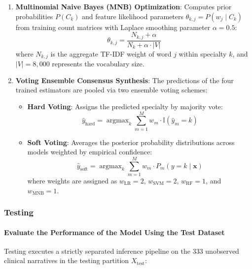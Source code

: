 \begin{enumerate}
    \item \textbf{Multinomial Naive Bayes (MNB) Optimization}:
    Computes prior probabilities $P(C_k)$ and feature likelihood parameters $\theta_{k,j} = P(w_j \mid C_k)$ from training count matrices with Laplace smoothing parameter $\alpha = 0.5$:
    \begin{equation}
        \theta_{k,j} = \frac{N_{k,j} + \alpha}{N_k + \alpha \cdot |V|}
    \end{equation}
    where $N_{k,j}$ is the aggregate TF-IDF weight of word $j$ within specialty $k$, and $|V| = 8,000$ represents the vocabulary size.

    \item \textbf{Voting Ensemble Consensus Synthesis}:
    The predictions of the four trained estimators are pooled via two ensemble voting schemes:
    \begin{itemize}
        \item \textbf{Hard Voting}: Assigns the predicted specialty by majority vote:
        \begin{equation}
            \hat{y}_{\text{hard}} = \operatorname{argmax}_k \sum_{m=1}^{M} w_m \cdot \mathbb{I}(\hat{y}_m = k)
        \end{equation}
        \item \textbf{Soft Voting}: Averages the posterior probability distributions across models weighted by empirical confidence:
        \begin{equation}
            \hat{y}_{\text{soft}} = \operatorname{argmax}_k \sum_{m=1}^{M} w_m \cdot P_m(y = k \mid \mathbf{x})
        \end{equation}
        where weights are assigned as $w_{\text{LR}} = 2$, $w_{\text{SVM}} = 2$, $w_{\text{RF}} = 1$, and $w_{\text{MNB}} = 1$.
    \end{itemize}
\end{enumerate}

\subsubsection{Testing}

\paragraph{Evaluate the Performance of the Model Using the Test Dataset}
Testing executes a strictly separated inference pipeline on the 333 unobserved clinical narratives in the testing partition $X_{\text{test}}$:

